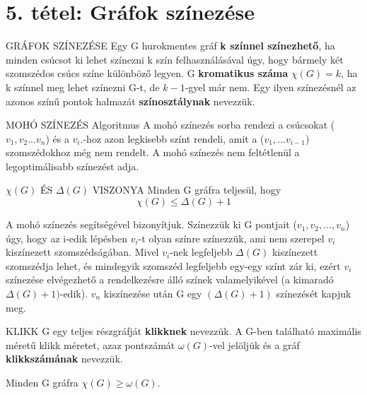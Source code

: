 \section{5. tétel: Gráfok színezése}

\begin{definicio}{GRÁFOK SZÍNEZÉSE}
Egy G hurokmentes gráf \textbf{k színnel színezhető}, ha minden csúcsot ki lehet színezni k szín felhasználásával úgy, hogy bármely két szomszédos csúcs színe különböző legyen. G \textbf{kromatikus száma} $\chi(G) = k$, ha k színnel meg lehet színezni G-t, de $k - 1$-gyel már nem. Egy ilyen színezésnél az azonos színű pontok halmazát \textbf{színosztálynak} nevezzük.
\end{definicio}

\begin{tetel}{MOHÓ SZÍNEZÉS Algoritmus}
A mohó színezés sorba rendezi a csúcsokat ($v_1, v_2...v_n$) és a $v_i.$-hoz azon legkisebb színt rendeli, amit a ($v_1,...v_{i-1}$) szomszédokhoz még nem rendelt. A mohó színezés nem feltétlenül a legoptimálisabb színezést adja.
\end{tetel}

\begin{tetel}{$\chi(G)$ ÉS $\Delta(G)$ VISZONYA}
Minden G gráfra teljesül, hogy
$$\chi(G) \leq \Delta(G)+1$$
\end{tetel}

\begin{bizonyitas}{}
A mohó színezés segítségével bizonyítjuk. Színezzük ki G pontjait ($v_1, v_2,..., v_n$) úgy, hogy az i-edik lépésben $v_i$-t olyan színre színezzük, ami nem szerepel $v_i$ kiszínezett szomszédságában. Mivel $v_i$-nek legfeljebb $\Delta(G)$ kiszínezett szomszédja lehet, és mindegyik szomszéd legfeljebb egy-egy színt zár ki, ezért $v_i$ színezése elvégezhető a rendelkezésre álló színek valamelyikével (a kimaradó $\Delta(G)+1)$-edik). $v_n$ kiszínezése után G egy $(\Delta(G)+1)$ színezését kapjuk meg.
\end{bizonyitas}

\begin{definicio}{KLIKK}
G egy teljes részgráfját \textbf{klikknek} nevezzük. A G-ben található maximális méretű klikk méretet, azaz pontszámát $\omega(G)$-vel jelöljük és a gráf \textbf{klikkszámának} nevezzük.
\end{definicio}

\begin{tetel}{Minden G gráfra $\chi(G) \geq \omega(G)$.}
\end{tetel}

